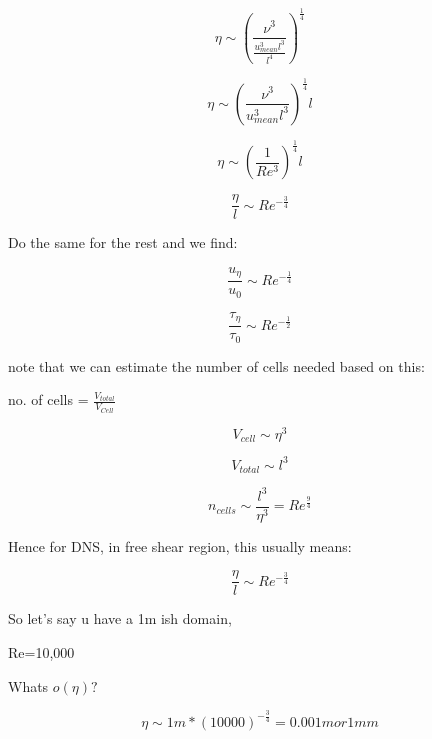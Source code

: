 \documentclass[12pt]{article}
\renewcommand{\_}{\kern-1.5pt\textunderscore\kern-1.5pt}
\begin{document}
\begin{itemize}
 \[  \eta  \sim  \left( \frac{ \nu ^{3}}{\frac{u_{mean}^{3}l^{3}}{l^{4}}} \right) ^{\frac{1}{4}} \] \par


\vspace{\baselineskip}
 \[  \eta  \sim  \left( \frac{ \nu ^{3}}{u_{mean}^{3}l^{3}} \right) ^{\frac{1}{4}}l \] \par

 \[  \eta  \sim  \left( \frac{1}{Re^{3}} \right) ^{\frac{1}{4}}l \] \par

 \[ \frac{ \eta }{l} \sim Re^{-\frac{3}{4}} \] \par

Do the same for the rest and we find:\par

 \[ \frac{u_{ \eta }}{u_{0}} \sim Re^{-\frac{1}{4}} \] \par

 \[ \frac{ \tau_{ \eta }}{ \tau_{0}} \sim Re^{-\frac{1}{2}} \] \par

note that we can estimate the number of cells needed based on this:\par

no. of cells =  \( \frac{V_{total}}{V_{Cell}} \) \par

 \[ V_{cell} \sim  \eta ^{3} \] \par

 \[ V_{total} \sim l^{3} \] \par

 \[ n_{cells} \sim \frac{l^{3}}{ \eta ^{3}}=Re^{\frac{9}{4}} \] \par


\vspace{\baselineskip}
Hence for DNS, in free shear region, this usually means:\par

 \[ \frac{ \eta }{l} \sim Re^{-\frac{3}{4}} \] \par

So let’s say u have a 1m ish domain,\par

Re=10,000\par

Whats  \( o \left(  \eta  \right) ? \) \par

 \[  \eta  \sim 1m\ast \left( 10000 \right) ^{-\frac{3}{4}}=0.001 m or 1mm \] \par


\end{itemize}
\end{document}
